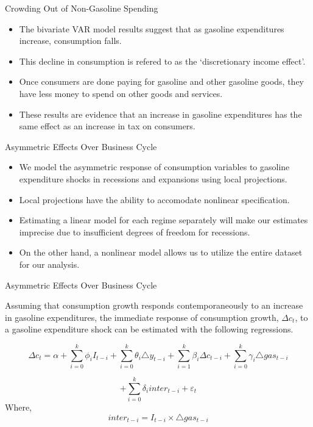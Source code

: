 \documentclass[
  10pt,
  ignorenonframetext,
]{beamer}
\begin{document}
\begin{frame}{Crowding Out of Non-Gasoline Spending}
\protect\hypertarget{crowding-out-of-non-gasoline-spending}{}

\begin{itemize}
\item
  The bivariate VAR model results suggest that as gasoline expenditures
  increase, consumption falls.
\item
  This decline in consumption is refered to as the `discretionary income
  effect'.
\item
  Once consumers are done paying for gasoline and other gasoline goods,
  they have less money to spend on other goods and services.
\item
  These results are evidence that an increase in gasoline expenditures
  has the same effect as an increase in tax on consumers.
\end{itemize}

\end{frame}

\begin{frame}{Asymmetric Effects Over Business Cycle}
\protect\hypertarget{asymmetric-effects-over-business-cycle}{}

\begin{itemize}
\item
  We model the asymmetric response of consumption variables to gasoline
  expenditure shocks in recessions and expansions using local
  projections.
\item
  Local projections have the ability to accomodate nonlinear
  specification.
\item
  Estimating a linear model for each regime separately will make our
  estimates imprecise due to insufficient degrees of freedom for
  recessions.
\item
  On the other hand, a nonlinear model allows us to utilize the entire
  dataset for our analysis.
\end{itemize}

\end{frame}

\begin{frame}{Asymmetric Effects Over Business Cycle}
\protect\hypertarget{asymmetric-effects-over-business-cycle-1}{}

Assuming that consumption growth responds contemporaneously to an
increase in gasoline expenditures, the immediate response of consumption
growth, \(\Delta c_t\), to a gasoline expenditure shock can be estimated
with the following regressions.

\[\Delta c_{t}=\alpha+ \sum_{i=0}^{k}\phi_{i}I_{t-i}+\sum_{i=0}^{k}\theta_{i}\triangle y_{t-i}+\sum_{i=1}^{k}\beta_{i}\Delta c_{t-i}+\sum_{i=0}^{k}\gamma_{i}\triangle gas_{t-i}\]

\[+\sum_{i=0}^{k}\delta_{i}inter_{t-i}+\varepsilon_t\] Where,
\[inter_{t-i}=I_{t-i} \times \triangle gas_{t-i}\]

\end{frame}
\end{document}
